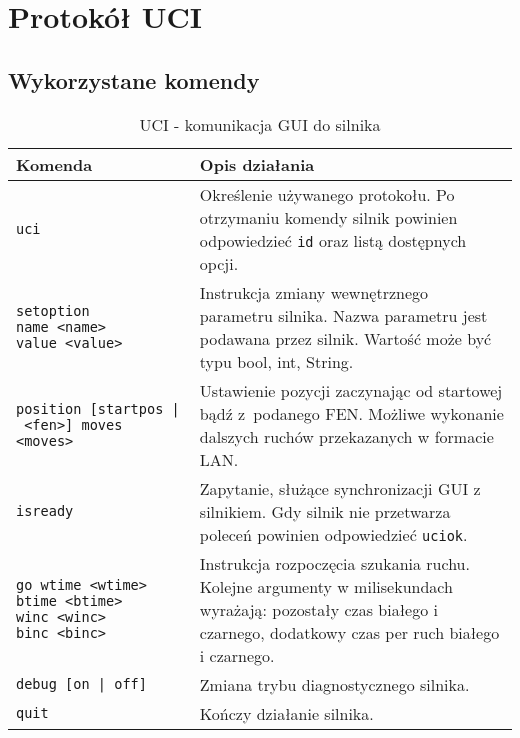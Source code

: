 \chapter{Protokół UCI}
\label{ch:protokol-uci}

\section{Wykorzystane komendy}
\label{sec:wykorzystane-komendy}

\begin{table}[htb] \small
\centering
\caption{UCI - komunikacja GUI do silnika}
\label{tab:UCI_GUI_silnik}
\begin{tabularx}{\linewidth}{|p{.35\linewidth}|X|}\hline
\textbf{Komenda} & \textbf{Opis działania} \\ \hline\hline

\texttt{uci} &
Określenie używanego protokołu.
Po otrzymaniu komendy silnik powinien odpowiedzieć \texttt{id} oraz listą dostępnych opcji.\\ \hline

\texttt{setoption name~<name> value~<value>} &
Instrukcja zmiany wewnętrznego parametru silnika.
Nazwa parametru jest podawana przez silnik.
Wartość może być typu bool, int, String. \\ \hline

\texttt{position [startpos~|~<fen>] moves <moves>} &
Ustawienie pozycji zaczynając od startowej bądź z~podanego FEN.
Możliwe wykonanie dalszych ruchów przekazanych w formacie LAN.\\ \hline

\texttt{isready} &
Zapytanie, służące synchronizacji GUI z silnikiem.
Gdy silnik nie przetwarza poleceń powinien odpowiedzieć \texttt{uciok}.\\ \hline

\texttt{go wtime~<wtime> btime~<btime> winc~<winc> binc~<binc>} &
Instrukcja rozpoczęcia szukania ruchu.
Kolejne argumenty w milisekundach wyrażają: pozostały czas białego i czarnego, dodatkowy czas per ruch białego i czarnego.\\ \hline

\texttt{debug [on | off]} &
Zmiana trybu diagnostycznego silnika. \\ \hline

\texttt{quit} &
Kończy działanie silnika. \\ \hline

\end{tabularx}
\end{table}

